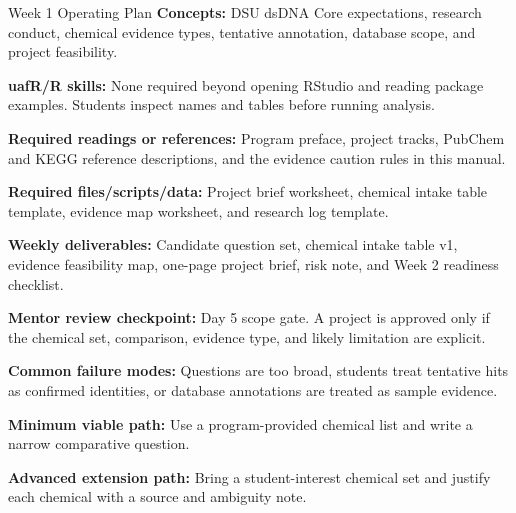 \begin{checklistbox}{Week 1 Operating Plan}
\textbf{Concepts:} DSU dsDNA Core expectations, research conduct, chemical evidence types, tentative annotation, database scope, and project feasibility.

\textbf{uafR/R skills:} None required beyond opening RStudio and reading package examples. Students inspect names and tables before running analysis.

\textbf{Required readings or references:} Program preface, project tracks, PubChem and KEGG reference descriptions, and the evidence caution rules in this manual.

\textbf{Required files/scripts/data:} Project brief worksheet, chemical intake table template, evidence map worksheet, and research log template.

\textbf{Weekly deliverables:} Candidate question set, chemical intake table v1, evidence feasibility map, one-page project brief, risk note, and Week 2 readiness checklist.

\textbf{Mentor review checkpoint:} Day 5 scope gate. A project is approved only if the chemical set, comparison, evidence type, and likely limitation are explicit.

\textbf{Common failure modes:} Questions are too broad, students treat tentative hits as confirmed identities, or database annotations are treated as sample evidence.

\textbf{Minimum viable path:} Use a program-provided chemical list and write a narrow comparative question.

\textbf{Advanced extension path:} Bring a student-interest chemical set and justify each chemical with a source and ambiguity note.
\end{checklistbox}

